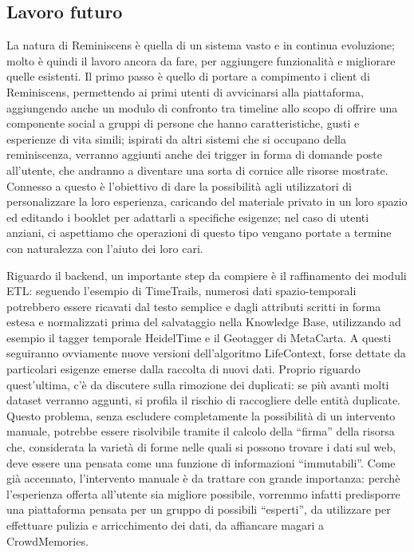 \documentclass[sigproc-sp.tex]{subfiles}
\begin{document}
\subsection{Lavoro futuro}
\label{subsec:futurework}
La natura di Reminiscens è quella di un sistema vasto e in continua evoluzione; molto è quindi il lavoro ancora da fare, per aggiungere funzionalità e migliorare quelle esistenti. Il primo passo è quello di portare a compimento i client di Reminiscens, permettendo ai primi utenti di avvicinarsi alla piattaforma, aggiungendo anche un modulo di confronto tra timeline allo scopo di offrire una componente social a gruppi di persone che hanno caratteristiche, gusti e esperienze di vita simili; ispirati da altri sistemi che si occupano della reminiscenza, verranno aggiunti anche dei trigger in forma di domande poste all’utente, che andranno a diventare una sorta di cornice alle risorse mostrate. Connesso a questo è l’obiettivo di dare la possibilità agli utilizzatori di personalizzare la loro esperienza, caricando del materiale privato in un loro spazio ed editando i booklet per adattarli a specifiche esigenze; nel caso di utenti anziani, ci aspettiamo che operazioni di questo tipo vengano portate a termine con naturalezza con l’aiuto dei loro cari. 

Riguardo il backend, un importante step da compiere è il raffinamento dei moduli ETL: seguendo l’esempio di TimeTrails, numerosi dati spazio-temporali potrebbero essere ricavati dal testo semplice e dagli attributi scritti in forma estesa e normalizzati prima del salvataggio nella Knowledge Base, utilizzando ad esempio il tagger temporale HeidelTime e il Geotagger di MetaCarta. A questi seguiranno ovviamente nuove versioni dell’algoritmo LifeContext, forse dettate da particolari esigenze emerse dalla raccolta di nuovi dati. Proprio riguardo quest’ultima, c’è da discutere sulla rimozione dei duplicati: se più avanti molti dataset verranno aggunti, si profila il rischio di raccogliere delle entità duplicate. Questo problema, senza escludere completamente la possibilità di un intervento manuale, potrebbe essere risolvibile tramite il calcolo della “firma” della risorsa che, considerata la varietà di forme nelle quali si possono trovare i dati sul web, deve essere una pensata come una funzione di informazioni “immutabili”. Come già accennato, l’intervento manuale è da trattare con grande importanza: perchè l’esperienza offerta all’utente sia migliore possibile, vorremmo infatti predisporre una piattaforma pensata per un gruppo di possibili “esperti”, da utilizzare per effettuare pulizia e arricchimento dei dati, da affiancare magari a CrowdMemories.
\end{document}
